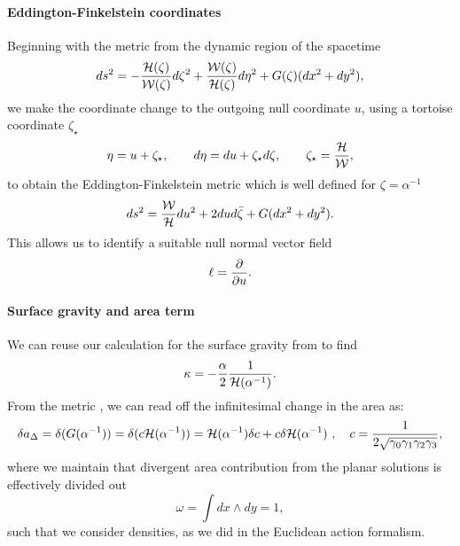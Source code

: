 \paragraph{Eddington-Finkelstein coordinates}
Beginning with the metric from the dynamic region of the spacetime 
\begin{equation*}
        ds^2  = - \frac{{\cal H}(\zeta)}{{\cal W}(\zeta)} d\zeta^2 + \frac{{\cal W}(\zeta)}{{\cal H}(\zeta)} d\eta^2 + G(\zeta)  (dx^2 + dy^2),
\end{equation*}
we make the coordinate change to the outgoing null coordinate $u$, using a tortoise coordinate $\zeta_\star$
\begin{equation*}
    \eta = u + \zeta_\star, \qquad d\eta = du + \zeta_\star d\zeta, \qquad \zeta_\star = \frac{{\cal H}}{{\cal W}},
\end{equation*}
to obtain the Eddington-Finkelstein metric which is well defined for $\zeta = \alpha^{-1}$
\begin{equation}
\label{eq:efmet} 
ds^2 = \frac{{\cal W}}{{\cal H}} du^2 + 2dud\bar{\zeta} + G( dx^2 + dy^2).
\end{equation}
This allows us to identify a suitable null normal vector field
\begin{equation*}
    \ell = \frac{\partial }{\partial u}.
\end{equation*}

\paragraph{Surface gravity and area term}
We can reuse our calculation for the surface gravity from  to find
\begin{equation*}
    \kappa = -\frac{\alpha}{2} \frac{1}{ {\cal H}(\alpha^{-1})}.
\end{equation*}
From the metric , we can read off the infinitesimal change in the area as:
\begin{equation*}
    \delta a_\Delta = \delta(G(\alpha^{-1})) = \delta(c {\cal H}(\alpha^{-1})) = {\cal H}(\alpha^{-1}) \delta c + c \delta {\cal H}(\alpha^{-1}) \ , \quad c = \frac{1}{2 \sqrt{\gamma_0 \gamma_1 \gamma_2 \gamma_3}},
\end{equation*}
where we maintain that divergent area contribution from the planar solutions is effectively divided out
\begin{equation*}
     \omega = \int dx \wedge dy = 1,
\end{equation*}
such that we consider densities, as we did in the Euclidean action formalism.
 
